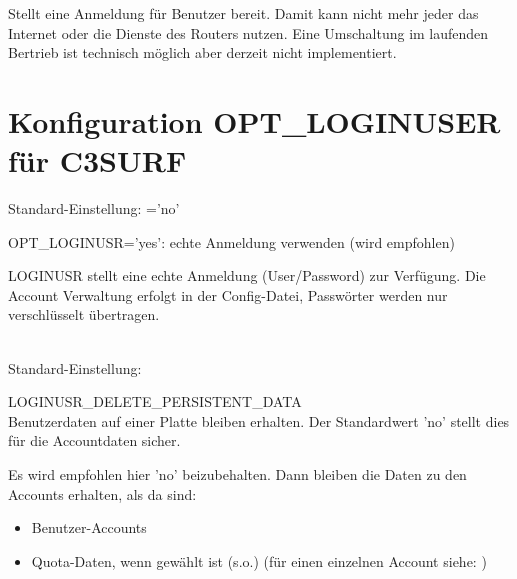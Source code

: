 Stellt eine Anmeldung für Benutzer bereit. Damit kann nicht mehr
jeder das Internet oder die Dienste des Routers nutzen. Eine Umschaltung
im laufenden Bertrieb ist technisch möglich aber derzeit nicht implementiert.


\section{Konfiguration OPT\_LOGINUSER für C3SURF}

\begin{description}

  Standard-Einstellung: ='no'

  OPT\_LOGINUSR='yes': echte Anmeldung verwenden (wird empfohlen)

  LOGINUSR stellt eine echte Anmeldung (User/Password) zur Verfügung. Die Account Verwaltung erfolgt
  in der Config-Datei, Passwörter werden nur verschlüsselt übertragen.

\ \\
  Standard-Einstellung: 

  LOGINUSR\_DELETE\_PERSISTENT\_DATA\\
  Benutzerdaten auf einer Platte bleiben erhalten.
  Der Standardwert 'no' stellt dies für die Accountdaten sicher.


  Es wird empfohlen hier 'no' beizubehalten. Dann bleiben die Daten zu den
  Accounts erhalten, als da sind:

\begin{itemize}
\item Benutzer-Accounts
\item Quota-Daten, wenn  gewählt ist
(s.o.) (für einen einzelnen Account siehe: )
\end{itemize}


\end{description}

